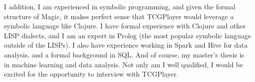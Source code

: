 \documentclass[11pt, letterpaper]{awesome-cv}
\begin{document}
\begin{cvletter}
I addition, I am experienced in symbolic programming, and given the formal structure of Magic, it makes perfect sense that TCGPlayer would leverage a symbolic language like Clojure. I have formal experience with Clojure and other LISP dialects, and I am an expert in Prolog (the most popular symbolic language outside of the LISPs). I also have experience working in Spark and Hive for data analysis, and a formal background in SQL. And of course, my master's thesis is in machine learning and data analysis. Not only am I well qualified, I would be excited for the opportunity to interview with TCGPlayer.

\end{cvletter}


\makeletterclosing
\end{document}
